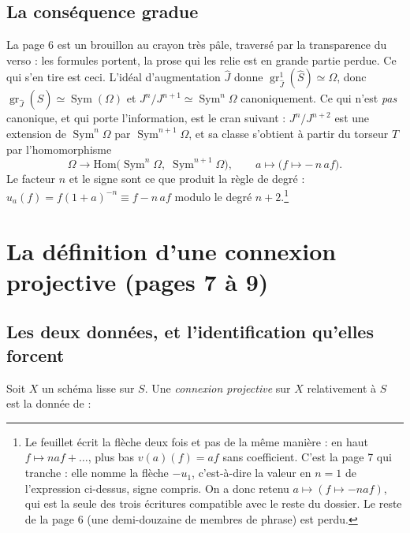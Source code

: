 \documentclass[11pt,a4paper]{article}
\begin{document}
\subsection*{La conséquence gradue}

La page 6 est un brouillon au crayon très pâle, traversé par la transparence
du verso : les formules portent, la prose qui les relie est en grande partie
perdue. Ce qui s'en tire est ceci. L'idéal d'augmentation $\widehat{J}$ donne
$\operatorname{gr}^1_{\widehat{J}}(\widehat{S}) \simeq \Omega$, donc
$\operatorname{gr}_{\widehat{J}}(\widehat{S}) \simeq
\operatorname{Sym}(\Omega)$ et $J^n/J^{n+1} \simeq \operatorname{Sym}^n\Omega$
canoniquement. Ce qui n'est \emph{pas} canonique, et qui porte l'information,
est le cran suivant : $J^n/J^{n+2}$ est une extension de
$\operatorname{Sym}^n\Omega$ par $\operatorname{Sym}^{n+1}\Omega$, et sa
classe s'obtient à partir du torseur $T$ par l'homomorphisme
\[
  \Omega \longrightarrow
  \mathrm{Hom}\big( \operatorname{Sym}^n \Omega,\;
  \operatorname{Sym}^{n+1} \Omega \big),
  \qquad a \longmapsto \big( f \mapsto -\,n\,a f \big).
\]
Le facteur $n$ et le signe sont ce que produit la règle de degré :
$u_a(f) = f(1+a)^{-n} \equiv f - n\,a f$ modulo le degré
$n+2$.\footnote{Le feuillet écrit la flèche deux fois et pas de la même
manière : en haut $f \mapsto n a f + \ldots$, plus bas $v(a)(f) = af$ sans
coefficient. C'est la page 7 qui tranche : elle nomme la flèche
$-u_1$, c'est-à-dire la valeur en $n=1$ de l'expression ci-dessus, signe
compris. On a donc retenu $a \mapsto (f \mapsto -naf)$, qui est la seule des
trois écritures compatible avec le reste du dossier. Le reste de la page 6
(une demi-douzaine de membres de phrase) est perdu.}

\section*{La définition d'une connexion projective (pages 7 à 9)}

\subsection*{Les deux données, et l'identification qu'elles forcent}

Soit $X$ un schéma lisse sur $S$. Une \emph{connexion projective} sur $X$
relativement à $S$ est la donnée de :
\end{document}
